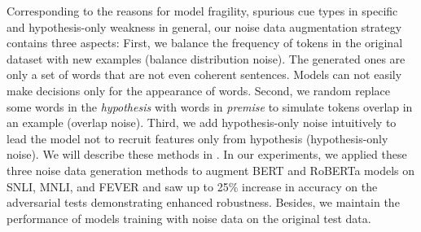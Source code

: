 Corresponding to the reasons for model fragility, 
spurious cue types in specific and hypothesis-only weakness in general,
our noise data augmentation strategy contains three aspects: 
First, we balance the frequency of tokens in the original dataset with new examples (balance distribution noise).
The generated ones are only a set of words that are not even coherent sentences. 
Models can not easily make decisions only for the appearance of words. 
Second, we random replace some words in the \textit{hypothesis}
with words in \textit{premise}
to simulate tokens overlap in an example (overlap noise). 
Third, we add hypothesis-only noise intuitively to lead the model not to recruit
features only from hypothesis (hypothesis-only noise). 
We will describe these methods in . 
In our experiments, we applied these three noise 
data generation methods to augment BERT and RoBERTa models on
SNLI, MNLI, and FEVER and saw up to 25\% 
increase in accuracy on the adversarial tests demonstrating enhanced robustness. 
Besides, we maintain 
the performance of models training with noise data on 
the original test data.

